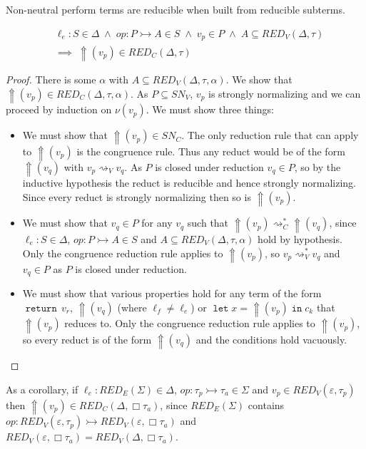 \documentclass[acmsmall, screen, review, anonymous]{acmart}
\theoremstyle{definition}
\newcommand{\glob}{\mathop{\Box}}
\newcommand{\reflectname}{\mathord{\Uparrow}}
\newcommand{\performraw}[2]{\mathop{\reflectname(#1(#2))}}
\newcommand{\perform}[3]{\performraw{#1}{#2}(#3)}
\newcommand{\loc}{\ell}
\newcommand{\types}{\mathrel{:}}
\newcommand{\cempty}{\varepsilon}
\newcommand{\returnname}{\mathop{\mathtt{return}}}
\newcommand{\return}[1]{\returnname\, #1}
\newcommand{\letvname}{\mathop{\mathtt{let}}}
\newcommand{\letv}[3]{\letvname #1 = #2 \mathop{\mathtt{in}} #3}
\newcommand{\stepstoname}{\rightsquigarrow}
\newcommand{\stepstov}{\stepstoname_V}
\newcommand{\reducestoname}{\stepstoname^{*}}
\newcommand{\reducestov}{\reducestoname_{V}}
\newcommand{\reducestoc}{\reducestoname_{C}}
\newcommand{\snv}{SN_V}
\newcommand{\snc}{SN_C}
\newcommand{\bound}[1]{\nu(#1)}
\newcommand{\redname}{RED}
\newcommand{\redvname}{\redname_{V}}
\newcommand{\redv}[2]{\redvname{({#1},{#2})}}
\newcommand{\redva}[3]{\redvname{({#1},{#2},{#3})}}
\newcommand{\redcname}{\redname_{C}}
\newcommand{\redc}[2]{\redcname{({#1},{#2})}}
\newcommand{\redca}[3]{\redcname{({#1},{#2},{#3})}}
\newcommand{\redsigname}{\redname_{E}}
\newcommand{\redsig}[1]{\redsigname{(#1)}}
\begin{document}
Non-neutral perform terms are reducible when built from reducible subterms.
\begin{lemma}
\label{lemma:red-perform-intro}
\begin{align*}
  &\loc_e \types S \in \Delta
   \; \wedge \; op \types P \rightarrowtail A \in S
   \; \wedge \; v_p \in P
   \; \wedge \; A \subseteq \redv{\Delta}{\tau} \\
  &\implies \; \perform{\loc_e}{op}{v_p} \in \redc{\Delta}{\tau}
\end{align*}
\end{lemma}
\begin{proof}
  There is some $\alpha$ with
  $A \subseteq \redva{\Delta}{\tau}{\alpha}$. We show that
  $\perform{\loc_e}{op}{v_p} \in \redca{\Delta}{\tau}{\alpha}$. As
  $P \subseteq \snv$, $v_p$ is strongly normalizing and we can proceed
  by induction on $\bound{v_p}$. We must show three things:
  \begin{itemize}
  \item We must show that $\perform{\loc_e}{op}{v_p} \in \snc$. The only
    reduction rule that can apply to $\perform{\loc_e}{op}{v_p}$ is the
    congruence rule. Thus any reduct would be of the form
    $\perform{\loc_e}{op}{v_q}$ with $v_p \stepstov v_q$. As $P$ is
    closed under reduction $v_q \in P$, so by the inductive
    hypothesis the reduct is reducible and hence strongly
    normalizing. Since every reduct is strongly normalizing then so is
    $\perform{\loc_e}{op}{v_p}$.
  \item We must show that $v_q \in P$ for any $v_q$ such that
    $\perform{\loc_e}{op}{v_p} \reducestoc \perform{\loc_e}{op}{v_q}$,
    since $\loc_e \types S \in \Delta$, $op \types P \rightarrowtail A
    \in S$ and $A \subseteq \redva{\Delta}{\tau}{\alpha}$ hold by
    hypothesis. Only the congruence reduction rule applies to
    $\perform{\loc_e}{op}{v_p}$, so $v_p \reducestov v_q$ and $v_q \in P$
    as $P$ is closed under reduction.
  \item We must show that various properties hold for any term of the
    form $\return{v_r}$, $\perform{\loc_f}{op}{v_q}$ (where
    $\loc_f \neq \loc_e$) or $\letv{x}{\perform{\loc}{op}{v_p}}{c_k}$
    that $\perform{\loc_e}{op}{v_p}$ reduces to. Only the congruence
    reduction rule applies to $\perform{\loc_e}{op}{v_p}$, so every
    reduct is of the form $\perform{\loc_e}{op}{v_q}$ and the
    conditions hold vacuously.
  \end{itemize}
\end{proof}
As a corollary, if $\loc_e \types \redsig{\Sigma} \in \Delta$,
$op \types \tau_p \rightarrowtail \tau_a \in \Sigma$ and
$v_p \in \redv{\cempty}{\tau_p}$ then
$\perform{\loc_e}{op}{v_p} \in \redc{\Delta}{\glob \tau_a}$, since
$\redsig{\Sigma}$ contains
$op \types \redv{\cempty}{\tau_p} \rightarrowtail
\redv{\cempty}{\glob \tau_a}$ and
$\redv{\cempty}{\glob \tau_a} = \redv{\Delta}{\glob \tau_a}$.
\end{document}
